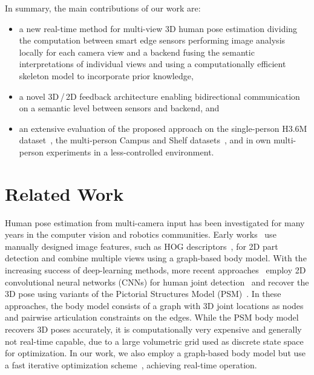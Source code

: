 \documentclass[conference]{IEEEtran}
\begin{document}
In summary, the main contributions of our work are:
\begin{itemize}
\item a new real-time method for multi-view 3D human pose estimation dividing the computation between smart edge sensors performing image analysis locally for each camera view and a backend fusing the semantic interpretations of individual views and using a computationally efficient skeleton model to incorporate prior knowledge,
\item a novel 3D\,/\,2D feedback architecture enabling bidirectional communication on a semantic level between sensors and backend, and
\item an extensive evaluation of the proposed approach on the single-person H3.6M dataset~\cite{h36m}, the multi-person Campus and Shelf datasets~\cite{belagiannis_3d_2014}, and in own multi-person experiments in a less-controlled environment.
\end{itemize}
 
\section{Related Work}
\label{sec:Related_Work}
Human pose estimation from multi-camera input has been investigated for many years in the computer vision and robotics communities.
Early works~\cite{belagiannis_3d_2014,belagiannis_multiple_2015,burenius_3d_2013} use manually designed image features, such as HOG descriptors~\cite{dalal2005histograms}, for 2D part detection and combine multiple views using a graph-based body model.
With the increasing success of deep-learning methods, more recent approaches~\cite{qiu_cross_2019,pavlakos_harvesting_2017,dong_fast_2019} employ 2D convolutional neural networks (CNNs) for human joint detection~\cite{cao_openpose_2018,xiao_simple_2018} and recover the 3D pose using variants of the Pictorial Structures Model (PSM)~\cite{belagiannis_3d_2014,burenius_3d_2013}. In these approaches, the body model consists of a graph with 3D joint locations as nodes and pairwise articulation constraints on the edges. While the PSM body model recovers 3D poses accurately, it is computationally very expensive and generally not real-time capable, due to a large volumetric grid used as discrete state space for optimization.
In our work, we also employ a graph-based body model but use a fast iterative optimization scheme~\cite{kaess2012isam2}, achieving real-time operation.
\end{document}
